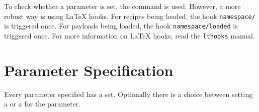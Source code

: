 \documentclass{ltxdoc}
\begin{document}
    \DescribeMacro{\hasparam} To check whether a parameter is set, the \cmd{\hasparam} command is used.
    However, a more robust way is using \LaTeX{} hooks.
    For recipes being loaded, the hook \texttt{namespace/} is triggered once.
    For payloads being loaded, the hook \texttt{namespace/}\texttt{loaded} is triggered once.
    For more information on \LaTeX{} hooks, read the \texttt{lthooks} manual.

    \clearpage

    \section{Parameter Specification}\label{sec:spec}
    Every parameter specified has a  set.
    Optionally there is a choice between setting a  or a  for the parameter.
\end{document}

